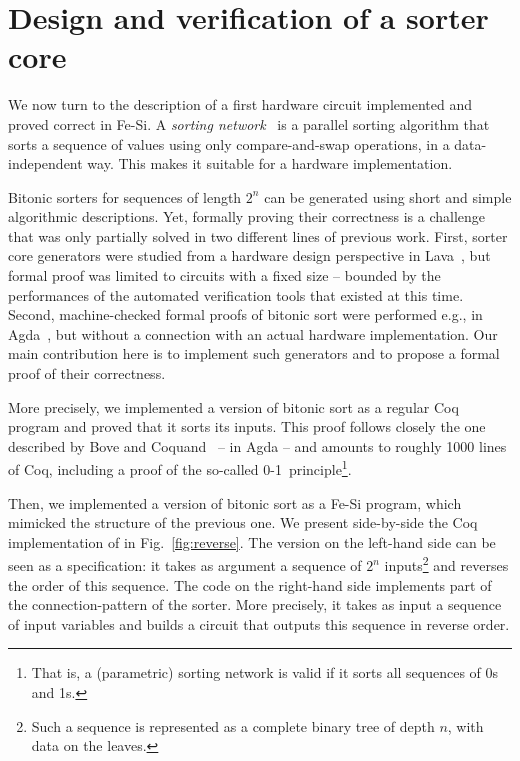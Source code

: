 \documentclass{llncs}
\begin{document}
\section{Design and verification of a sorter core}
We now turn to the description of a first hardware circuit implemented
and proved correct in Fe-Si. 
%
A \emph{sorting network}~\cite{DBLP:books/mg/CormenLRS01} is a
parallel sorting algorithm that sorts a sequence of values using only
compare-and-swap operations, in a data-independent way. This makes it
suitable for a hardware implementation.

Bitonic sorters for sequences of length $2^n$ can be generated using
short and simple algorithmic descriptions. Yet, formally proving their
correctness is a challenge that was only partially solved in two
different lines of previous work.
%
First, sorter core generators were studied from a hardware design
perspective in Lava~\cite{DBLP:conf/charme/ClaessenSS01}, but formal
proof was limited to circuits with a fixed size -- bounded by the
performances of the automated verification tools that existed at this
time.
%
Second, machine-checked formal proofs of bitonic sort were performed
e.g., in Agda~\cite{DBLP:conf/types/BoveC04}, but without a
connection with an actual hardware implementation. 
%
Our main contribution here is to implement such generators and to
propose a formal proof of their correctness.

More precisely, we implemented a version of bitonic sort as a regular
Coq program and proved that it sorts its inputs. This proof follows
closely the one described by Bove and
Coquand~\cite{DBLP:conf/types/BoveC04} -- in Agda -- and amounts to
roughly 1000 lines of Coq, including a proof of the so-called
\mbox{0-1~principle}\footnote{That is, a (parametric) sorting network
  is valid if it sorts all sequences of 0s and 1s.}.

Then, we implemented a version of bitonic sort as a Fe-Si program,
which mimicked the structure of the previous one. We present
side-by-side the Coq implementation of  in
Fig.~\ref{fig:reverse}.
%
The version on the left-hand side can be seen as a specification: it
takes as argument a sequence of $2^n$ inputs\footnote{Such a sequence
  is represented as a complete binary tree of depth $n$, with data on
  the leaves.} and reverses the order of this sequence.
%
The code on the right-hand side implements part of the
connection-pattern of the sorter. More precisely, it takes as input a
sequence of input variables and builds a circuit that outputs this
sequence in reverse order. 
\end{document}
